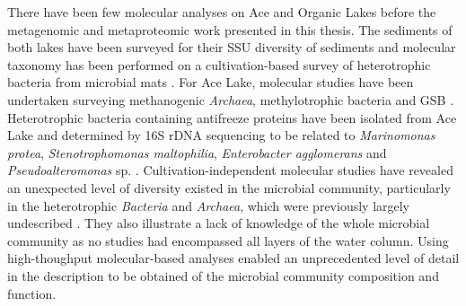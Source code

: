There have been few molecular analyses on Ace and Organic Lakes before the metagenomic and metaproteomic work presented in this thesis.
The sediments of both lakes have been surveyed for their \ac{SSU} diversity of sediments \cite{Bowman2000a, Bowman2000b} and molecular taxonomy has been performed on a cultivation-based survey of heterotrophic bacteria from microbial mats \cite{VanTrappen2002}.
For Ace Lake, molecular studies have been undertaken surveying methanogenic \emph{Archaea}, methylotrophic bacteria and \ac{GSB} \cite{Coolen2004a, Coolen2004b, Coolen2006}.
Heterotrophic bacteria containing antifreeze proteins have been isolated from Ace Lake and determined by 16S rDNA sequencing to be related to \emph{Marinomonas protea}, \emph{Stenotrophomonas maltophilia}, \emph{Enterobacter agglomerans} and \emph{Pseudoalteromonas} sp. \cite{Gilbert2004}.
Cultivation-independent  molecular studies have revealed an unexpected level of diversity existed in the microbial community, particularly in the heterotrophic \emph{Bacteria} and \emph{Archaea}, which were previously largely undescribed \cite{Bowman2000a, Bowman2000b, Coolen2004a, Coolen2004b, Coolen2006}.
They also illustrate a lack of knowledge of the whole microbial community as no studies had encompassed all layers of the water column.
Using high-thoughput molecular-based analyses enabled an unprecedented level of detail in the description to be obtained of the microbial community composition and function.
